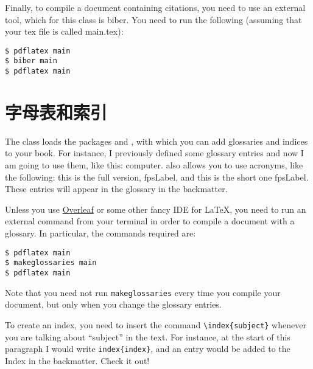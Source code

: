 Finally, to compile a document containing citations, you need to use an
external tool, which for this class is biber. You need to run the
following (assuming that your tex file is called main.tex):

\begin{lstlisting}[style=kaolstplain]
$ pdflatex main
$ biber main
$ pdflatex main
\end{lstlisting}

\section{字母表和索引}

The  class loads the packages  and
, with which you can add glossaries and indices to
your book. For instance, I previously defined some glossary entries and
now I am going to use them, like this: \gls{computer}.
 also allows you to use acronyms, like the
following: this is the full version, \acrfull{fpsLabel}, and this is the
short one \acrshort{fpsLabel}. These entries will appear in the glossary
in the backmatter.

Unless you use \href{https://www.overleaf.com}{Overleaf} or some other
fancy IDE for \LaTeX, you need to run an external command from your
terminal in order to compile a document with a glossary. In particular,
the commands required are:

\begin{lstlisting}[style=kaolstplain]
$ pdflatex main
$ makeglossaries main
$ pdflatex main
\end{lstlisting}

Note that you need not run \texttt{makeglossaries} every time you
compile your document, but only when you change the glossary entries.

To create an index, you need to insert the command
\lstinline|\index{subject}| whenever you are talking about
\enquote{subject} in the text. For instance, at the start of this
paragraph I would write \lstinline|index{index}|, and an entry would be
added to the Index in the backmatter. Check it out!


